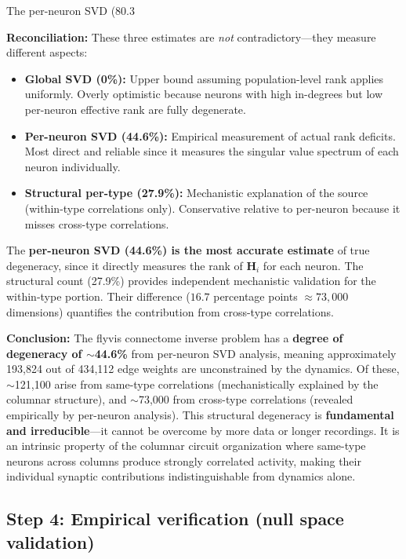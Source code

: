 \documentclass[11pt,a4paper]{article}
\begin{document}
The per-neuron SVD (80.3%

\noindent\textbf{Reconciliation:} These three estimates are \emph{not} contradictory---they measure different aspects:
\begin{itemize}[nosep]
\item \textbf{Global SVD (0\%):} Upper bound assuming population-level rank applies uniformly. Overly optimistic because neurons with high in-degrees but low per-neuron effective rank are fully degenerate.
\item \textbf{Per-neuron SVD (44.6\%):} Empirical measurement of actual rank deficits. Most direct and reliable since it measures the singular value spectrum of each neuron individually.
\item \textbf{Structural per-type (27.9\%):} Mechanistic explanation of the source (within-type correlations only). Conservative relative to per-neuron because it misses cross-type correlations.
\end{itemize}

The \textbf{per-neuron SVD (44.6\%) is the most accurate estimate} of true degeneracy, since it directly measures the rank of $\mathbf{H}_i$ for each neuron. The structural count (27.9\%) provides independent mechanistic validation for the within-type portion. Their difference ($16.7$ percentage points $\approx 73{,}000$ dimensions) quantifies the contribution from cross-type correlations.

\noindent\textbf{Conclusion:} The flyvis connectome inverse problem has a \textbf{degree of degeneracy of $\sim$44.6\%} from per-neuron SVD analysis, meaning approximately 193,824 out of 434,112 edge weights are unconstrained by the dynamics. Of these, $\sim$121,100 arise from same-type correlations (mechanistically explained by the columnar structure), and $\sim$73,000 from cross-type correlations (revealed empirically by per-neuron analysis). This structural degeneracy is \textbf{fundamental and irreducible}---it cannot be overcome by more data or longer recordings. It is an intrinsic property of the columnar circuit organization where same-type neurons across columns produce strongly correlated activity, making their individual synaptic contributions indistinguishable from dynamics alone.


\subsection{Step 4: Empirical verification (null space validation)}
\end{document}
